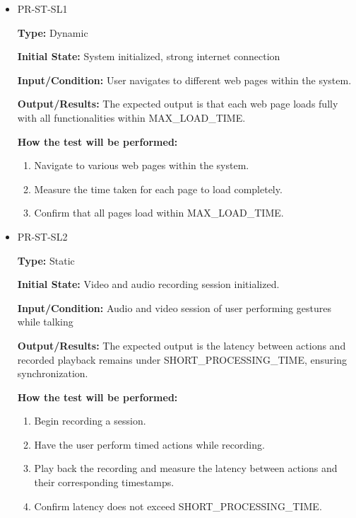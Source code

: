 \documentclass[12pt, titlepage]{article}
\begin{document}
\begin{itemize}
  \item PR-ST-SL1
  \begin{mdframed}[linewidth=0.5mm]
      \textbf{Type:} Dynamic\par
      \textbf{Initial State:} System initialized, strong internet connection \par
      \textbf{Input/Condition:} User navigates to different web pages within the system. \par
      \textbf{Output/Results:} The expected output is that each web page loads fully with all functionalities within MAX\_LOAD\_TIME. \par
      \textbf{How the test will be performed:}
      \begin{enumerate}[noitemsep]
        \item Navigate to various web pages within the system.
        \item Measure the time taken for each page to load completely.
        \item Confirm that all pages load within MAX\_LOAD\_TIME.
      \end{enumerate}
  \end{mdframed}
  \item PR-ST-SL2
  \begin{mdframed}[linewidth=0.5mm]
      \textbf{Type:} Static \par
      \textbf{Initial State:} Video and audio recording session initialized. \par
      \textbf{Input/Condition:} Audio and video session of user performing gestures while talking \par
      \textbf{Output/Results:} The expected output is the latency between actions and \\ recorded playback remains under SHORT\_PROCESSING\_TIME, ensuring \\ synchronization. \par
      \textbf{How the test will be performed:}
      \begin{enumerate}[noitemsep]
        \item Begin recording a session.
        \item Have the user perform timed actions while recording.
        \item Play back the recording and measure the latency between actions and their corresponding timestamps.
        \item Confirm latency does not exceed SHORT\_PROCESSING\_TIME.

\end{enumerate}
\end{mdframed}
\end{itemize}
\end{document}
